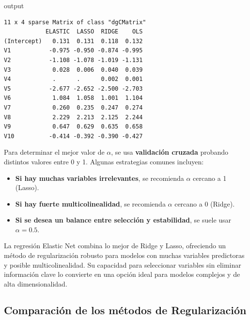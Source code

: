 \documentclass[
  letterpaper,
  DIV=11,
  numbers=noendperiod]{scrreprt}
\newenvironment{Shaded}{\begin{snugshade}}{\end{snugshade}}
\newcommand{\NormalTok}[1]{\textcolor[rgb]{0.00,0.23,0.31}{#1}}
\providecommand{\tightlist}{%
  \setlength{\itemsep}{0pt}\setlength{\parskip}{0pt}}
\begin{document}
\begin{tcolorbox}
\begin{Shaded}
\begin{Highlighting}[]
\NormalTok{output}
\end{Highlighting}
\end{Shaded}

\begin{verbatim}
11 x 4 sparse Matrix of class "dgCMatrix"
            ELASTIC  LASSO  RIDGE    OLS
(Intercept)   0.131  0.131  0.118  0.132
V1           -0.975 -0.950 -0.874 -0.995
V2           -1.108 -1.078 -1.019 -1.131
V3            0.028  0.006  0.040  0.039
V4            .      .      0.002  0.001
V5           -2.677 -2.652 -2.500 -2.703
V6            1.084  1.058  1.001  1.104
V7            0.260  0.235  0.247  0.274
V8            2.229  2.213  2.125  2.244
V9            0.647  0.629  0.635  0.658
V10          -0.414 -0.392 -0.390 -0.427
\end{verbatim}

\end{tcolorbox}

Para determinar el mejor valor de \(\alpha\), se usa \textbf{validación
cruzada} probando distintos valores entre \(0\) y 1. Algunas estrategias
comunes incluyen:

\begin{itemize}
\tightlist
\item
  \textbf{Si hay muchas variables irrelevantes}, se recomienda
  \(\alpha\) cercano a 1 (Lasso).
\item
  \textbf{Si hay fuerte multicolinealidad}, se recomienda \(\alpha\)
  cercano a 0 (Ridge).
\item
  \textbf{Si se desea un balance entre selección y estabilidad}, se
  suele usar \(\alpha = 0.5\).
\end{itemize}

La regresión Elastic Net combina lo mejor de Ridge y Lasso, ofreciendo
un método de regularización robusto para modelos con muchas variables
predictoras y posible multicolinealidad. Su capacidad para seleccionar
variables sin eliminar información clave lo convierte en una opción
ideal para modelos complejos y de alta dimensionalidad.

\subsection{Comparación de los métodos de
Regularización}\label{comparaciuxf3n-de-los-muxe9todos-de-regularizaciuxf3n}
\end{document}
